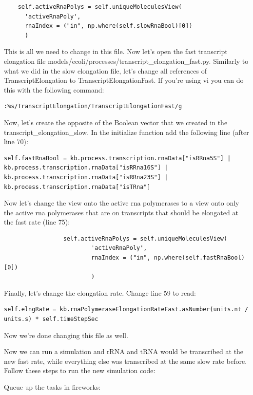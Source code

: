 \documentclass[12pt]{article}
\begin{document}
\begin{lstlisting}
    self.activeRnaPolys = self.uniqueMoleculesView(
      'activeRnaPoly',
      rnaIndex = ("in", np.where(self.slowRnaBool)[0])
      )
\end{lstlisting}

This is all we need to change in this file. Now let’s open the fast transcript elongation file models/ecoli/processes/transcript\_elongation\_fast.py. Similarly to what we did in the slow elongation file, let’s change all references of TranscriptElongation to TranscriptElongationFast. If you’re using vi you can do this with the following command:

\lstset{language=bash}
\begin{lstlisting}
:%s/TranscriptElongation/TranscriptElongationFast/g
\end{lstlisting}

Now, let’s create the opposite of the Boolean vector that we created in the transcript\_elongation\_slow. In the initialize function add the following line (after line 70):

\lstset{language=Python}
\begin{lstlisting}
self.fastRnaBool = kb.process.transcription.rnaData["isRRna5S"] | kb.process.transcription.rnaData["isRRna16S"] | kb.process.transcription.rnaData["isRRna23S"] | kb.process.transcription.rnaData["isTRna"]
\end{lstlisting}

Now let’s change the view onto the active rna polymerases to a view onto only the active rna polymerases that are on transcripts that should be elongated at the fast rate (line 75):

\begin{lstlisting}
                 self.activeRnaPolys = self.uniqueMoleculesView(
                         'activeRnaPoly',
                         rnaIndex = ("in", np.where(self.fastRnaBool)[0])
                         )
\end{lstlisting}

Finally, let’s change the elongation rate. Change line 59 to read:

\begin{lstlisting}
self.elngRate = kb.rnaPolymeraseElongationRateFast.asNumber(units.nt / units.s) * self.timeStepSec
\end{lstlisting}

Now we’re done changing this file as well.
\par
Now we can run a simulation and rRNA and tRNA would be transcribed at the new fast rate, while everything else was transcribed at the same slow rate before. Follow these steps to run the new simulation code:
\par
Queue up the tasks in fireworks:
\end{document}
